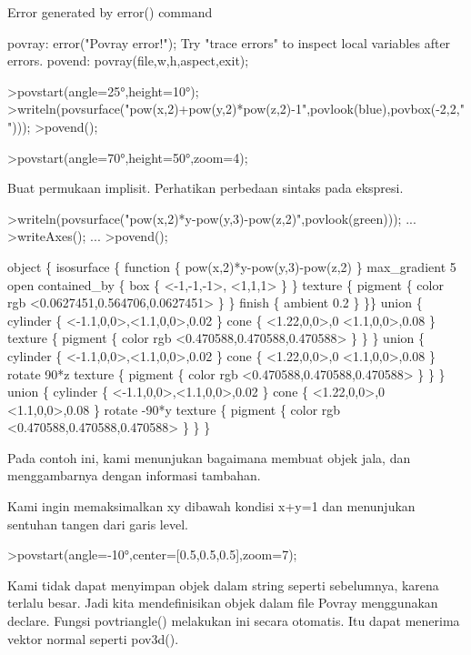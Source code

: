 \documentclass[a4paper,10pt]{article}
\begin{document}
\begin{eulernotebook}
\begin{eulercomment}
\begin{eulercomment}
\begin{euleroutput}
  Error generated by error() command
  
  povray:
      error("Povray error!");
  Try "trace errors" to inspect local variables after errors.
  povend:
      povray(file,w,h,aspect,exit); 
\end{euleroutput}
\begin{eulerprompt}
>povstart(angle=25°,height=10°); 
>writeln(povsurface("pow(x,2)+pow(y,2)*pow(z,2)-1",povlook(blue),povbox(-2,2,"")));
>povend();
\end{eulerprompt}
\begin{eulerprompt}
>povstart(angle=70°,height=50°,zoom=4);
\end{eulerprompt}
\begin{eulercomment}
Buat permukaan implisit. Perhatikan perbedaan sintaks pada ekspresi.
\end{eulercomment}
\begin{eulerprompt}
>writeln(povsurface("pow(x,2)*y-pow(y,3)-pow(z,2)",povlook(green))); ...
>writeAxes(); ...
>povend();
\end{eulerprompt}
\begin{euleroutput}
  object \{
  isosurface \{
  function \{ pow(x,2)*y-pow(y,3)-pow(z,2) \}
  max_gradient 5
  open
  contained_by \{ box \{ <-1,-1,-1>, <1,1,1>
   \} \}
   texture \{ pigment \{ color rgb <0.0627451,0.564706,0.0627451> \}  \} 
   finish \{ ambient 0.2 \} 
  \}\}
  union \{
    cylinder \{ <-1.1,0,0>,<1.1,0,0>,0.02 \}
    cone \{ 
      <1.22,0,0>,0
      <1.1,0,0>,0.08
    \}
    texture \{ pigment \{ color rgb <0.470588,0.470588,0.470588> \} \}
  \}
  union \{
    cylinder \{ <-1.1,0,0>,<1.1,0,0>,0.02 \}
    cone \{ 
      <1.22,0,0>,0
      <1.1,0,0>,0.08
    \}
    rotate 90*z
    texture \{ pigment \{ color rgb <0.470588,0.470588,0.470588> \} \}
  \}
  union \{
    cylinder \{ <-1.1,0,0>,<1.1,0,0>,0.02 \}
    cone \{ 
      <1.22,0,0>,0
      <1.1,0,0>,0.08
    \}
    rotate -90*y
    texture \{ pigment \{ color rgb <0.470588,0.470588,0.470588> \} \}
  \}
\end{euleroutput}
\begin{eulercomment}
Pada contoh ini, kami menunjukan bagaimana membuat objek jala, dan
menggambarnya dengan informasi tambahan.

Kami ingin memaksimalkan xy dibawah kondisi x+y=1 dan menunjukan
sentuhan tangen dari garis level.
\end{eulercomment}
\begin{eulerprompt}
>povstart(angle=-10°,center=[0.5,0.5,0.5],zoom=7);
\end{eulerprompt}
\begin{eulercomment}
Kami tidak dapat menyimpan objek dalam string seperti sebelumnya,
karena terlalu besar. Jadi kita mendefinisikan objek dalam file Povray
menggunakan declare. Fungsi povtriangle() melakukan ini secara
otomatis. Itu dapat menerima vektor normal seperti pov3d().


\end{eulercomment}
\end{eulercomment}
\end{eulercomment}
\end{eulernotebook}
\end{document}
